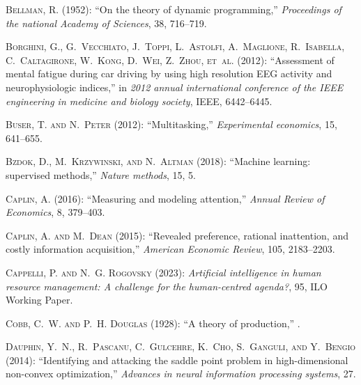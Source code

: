 \documentclass[11pt]{article}
\theoremstyle{definition}
\theoremstyle{remark}
\begin{document}
\begin{thebibliography}{70}
\textsc{Bellman, R.} (1952): \enquote{On the theory of dynamic programming,} \emph{Proceedings of the national Academy of Sciences}, 38, 716--719.

\textsc{Borghini, G., G.~Vecchiato, J.~Toppi, L.~Astolfi, A.~Maglione, R.~Isabella, C.~Caltagirone, W.~Kong, D.~Wei, Z.~Zhou, et~al.} (2012): \enquote{Assessment of mental fatigue during car driving by using high resolution EEG activity and neurophysiologic indices,} in \emph{2012 annual international conference of the IEEE engineering in medicine and biology society}, IEEE, 6442--6445.

\textsc{Buser, T. and N.~Peter} (2012): \enquote{Multitasking,} \emph{Experimental economics}, 15, 641--655.

\textsc{Bzdok, D., M.~Krzywinski, and N.~Altman} (2018): \enquote{Machine learning: supervised methods,} \emph{Nature methods}, 15, 5.

\textsc{Caplin, A.} (2016): \enquote{Measuring and modeling attention,} \emph{Annual Review of Economics}, 8, 379--403.

\textsc{Caplin, A. and M.~Dean} (2015): \enquote{Revealed preference, rational inattention, and costly information acquisition,} \emph{American Economic Review}, 105, 2183--2203.

\textsc{Cappelli, P. and N.~G. Rogovsky} (2023): \emph{Artificial intelligence in human resource management: A challenge for the human-centred agenda?}, 95, ILO Working Paper.

\textsc{Cobb, C.~W. and P.~H. Douglas} (1928): \enquote{A theory of production,} .

\textsc{Dauphin, Y.~N., R.~Pascanu, C.~Gulcehre, K.~Cho, S.~Ganguli, and Y.~Bengio} (2014): \enquote{Identifying and attacking the saddle point problem in high-dimensional non-convex optimization,} \emph{Advances in neural information processing systems}, 27.


\end{thebibliography}
\end{document}
